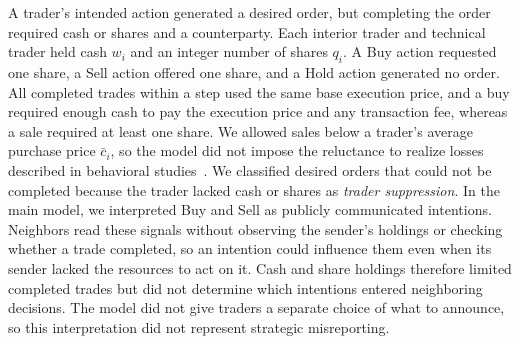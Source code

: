 A trader's intended action generated a desired order, but completing the
order required cash or shares and a counterparty. Each interior trader
and technical trader held cash $w_i$ and an integer number of shares
$q_i$. A Buy action requested one share, a Sell action offered one
share, and a Hold action generated no order. All completed trades within
a step used the same base execution price, and a buy required enough
cash to pay the execution price and any transaction fee, whereas a sale
required at least one share. We allowed sales below a trader's average
purchase price $\bar c_i$, so the model did not impose the reluctance to
realize losses described in behavioral
studies~\cite{shefrin1985disposition,odean1998investors}. We classified
desired orders that could not be completed because the trader lacked
cash or shares as \emph{trader suppression}. In the main model, we
interpreted Buy and Sell as publicly communicated intentions. Neighbors
read these signals without observing the sender's holdings or checking
whether a trade completed, so an intention could influence them even
when its sender lacked the resources to act on it. Cash and share
holdings therefore limited completed trades but did not determine which
intentions entered neighboring decisions. The model did not give traders
a separate choice of what to announce, so this interpretation did not
represent strategic misreporting.

